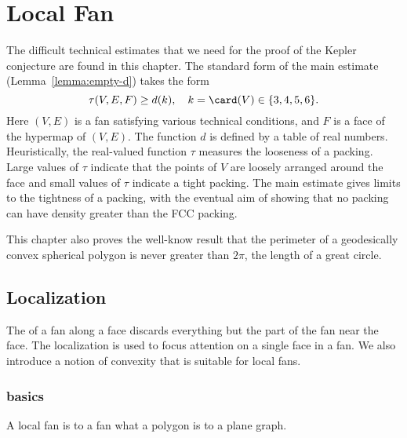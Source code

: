 %

\chapter{Local Fan}\label{sec:local}


\begin{summary}
  The difficult technical estimates that we need for the proof of the
  Kepler conjecture are found in this chapter.  The standard form
of the main estimate
  (Lemma~\ref{lemma:empty-d}) takes the form
\begin{equation}\label{eqn:main}
\tau(V,E,F) \ge d(k),\quad k= \card(V)\in \{3,4,5,6\}.
\end{equation}
Here $(V,E)$ is a fan satisfying various technical conditions, and $F$
is a face of the hypermap of $(V,E)$.  The function $d$ is defined by
a table of real numbers.  Heuristically, the real-valued
function $\tau$ measures the looseness of a packing.  Large values of
$\tau$ indicate that the points of $V$ are loosely arranged around the
face and small values of $\tau$ indicate a tight packing.  The main
estimate gives limits to the tightness of a packing, with the eventual
aim of showing that no packing can have density greater than the FCC
packing.  

This chapter also proves the well-know result that the perimeter of a
geodesically convex spherical polygon is never greater than $2\pi$,
the length of a great circle.
\end{summary}


\section{Localization}

The  of a fan along
a face discards everything but the part of the fan near the face.  
The localization is used to focus attention on a single face
in a fan.  
We also introduce a notion of convexity that is suitable for local fans.

\subsection{basics}

A local fan is to a fan what a polygon is to a plane graph.  


